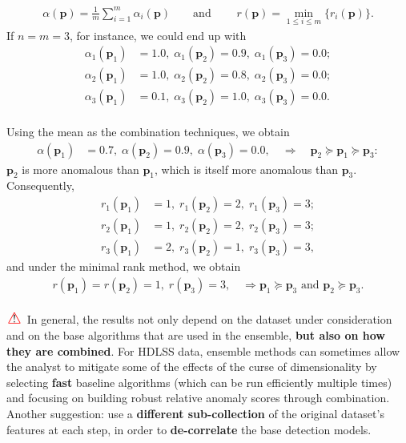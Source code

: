 \documentclass[20pt,landscape,footrule,headrule]{foils}
\newcommand{\newl}{\newline\newline}
\newcommand\Warning{%
 \makebox[1.4em][c]{%
 \makebox[0pt][c]{\raisebox{.1em}{!}}%
 \makebox[0pt][c]{\color{red}\Large$\bigtriangleup$}}}%
\begin{document}
{{\begin{align*}
\alpha(\mathbf{p})=\frac{1}{m}\sum_{i=1}^{m}\alpha_i(\mathbf{p}) \qquad \text{and}\; \qquad r(\mathbf{p}) =\min_{1\leq i \leq m} \{r_i(\mathbf{p})\}.
\end{align*}
If $n=m=3$, for instance, we could end up with 
\begin{align*}\alpha_{1}\left(\mathbf{p}_{1}\right)&=1.0,\; \alpha_{1}\left(\mathbf{p}_{2}\right)=0.9,\; \alpha_{1}\left(\mathbf{p}_{3}\right)=0.0; \\ 
\alpha_{2}\left(\mathbf{p}_{1}\right)&=1.0,\; \alpha_{2}\left(\mathbf{p}_{2}\right)=0.8,\; \alpha_{2}\left(\mathbf{p}_{3}\right)=0.0;\\
\alpha_{3}\left(\mathbf{p}_{1}\right)&=0.1,\;  \alpha_{3}\left(\mathbf{p}_{2}\right)=1.0,\; \alpha_{3}\left(\mathbf{p}_{3}\right)=0.0.
\end{align*}\newpage\ \\ \noindent
Using the mean as the combination techniques, we obtain
\begin{align*}
\alpha\left(\mathbf{p}_{1}\right)&=0.7,\; \alpha\left(\mathbf{p}_{2}\right)=0.9,\; \alpha\left(\mathbf{p}_{3}\right)=0.0, \quad \Longrightarrow \quad \mathbf{p}_2\succeq \mathbf{p}_1\succeq \mathbf{p}_3:
\end{align*}
 $\mathbf{p}_2$ is more anomalous than $\mathbf{p}_1$, which is itself more anomalous than  $\mathbf{p}_3$. 
\newl 
Consequently,  
\begin{align*}
r_{1}\left(\mathbf{p}_{1}\right)&=1,\; r_{1}\left(\mathbf{p}_{2}\right)=2,\; r_{1}\left(\mathbf{p}_{3}\right)=3;\\ 
r_{2}\left(\mathbf{p}_{1}\right)&=1,\; r_{2}\left(\mathbf{p}_{2}\right)=2,\; r_{2}\left(\mathbf{p}_{3}\right)=3;\\
r_{3}\left(\mathbf{p}_{1}\right)&=2,\; r_{3}\left(\mathbf{p}_{2}\right)=1,\; r_{3}\left(\mathbf{p}_{3}\right)=3,
\end{align*}
and under the minimal rank method, we obtain
\begin{align*}
r\left(\mathbf{p}_{1}\right)=r\left(\mathbf{p}_{2}\right)=1,\; r \left(\mathbf{p}_{3}\right)=3, \quad\Longrightarrow \mathbf{p}_1\succeq \mathbf{p}_3\text{ and }\mathbf{p}_2\succeq \mathbf{p}_3.  
\end{align*}
\newpage \ \\ \noindent $\Warning$ In general, the results not only depend on the dataset under consideration and on the base algorithms that are used in the ensemble, \textbf{but also on how they are combined}. 
\newl For HDLSS data, ensemble methods can sometimes allow the analyst to mitigate some of the effects of the curse of dimensionality by selecting \textbf{fast}  baseline algorithms (which can be run efficiently multiple times) and focusing on building robust relative anomaly scores through combination. \newl Another suggestion: use a \textbf{different sub-collection} of the original dataset's features at each step, in order to \textbf{de-correlate} the base detection models.
}}
\end{document}
